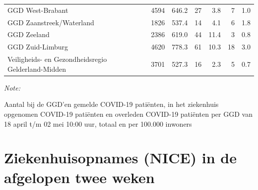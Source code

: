 \documentclass[
  english,
  man,floatsintext]{apa6}
\begin{document}
\begin{table}
\begin{threeparttable}
\begin{tabular}{lrrrrrr}
GGD West-Brabant & 4594 & 646.2 & 27 & 3.8 & 7 & 1.0\\
GGD Zaanstreek/Waterland & 1826 & 537.4 & 14 & 4.1 & 6 & 1.8\\
GGD Zeeland & 2386 & 619.0 & 44 & 11.4 & 3 & 0.8\\
GGD Zuid-Limburg & 4620 & 778.3 & 61 & 10.3 & 18 & 3.0\\
Veiligheids- en Gezondheidsregio Gelderland-Midden & 3701 & 527.3 & 16 & 2.3 & 5 & 0.7\\
\bottomrule
\end{tabular}
\begin{tablenotes}
\item \textit{Note: } 
\item Aantal bij de GGD’en gemelde COVID-19 patiënten, in het ziekenhuis opgenomen COVID-19 patiënten en overleden COVID-19 patiënten per GGD van 18 april t/m 02 mei 10:00 uur, totaal en per 100.000 inwoners
\end{tablenotes}
\end{threeparttable}
\endgroup{}
\end{table}

\newpage

\hypertarget{ziekenhuisopnames-nice-in-de-afgelopen-twee-weken}{%
\section{Ziekenhuisopnames (NICE) in de afgelopen twee weken}\label{ziekenhuisopnames-nice-in-de-afgelopen-twee-weken}}
\end{document}
